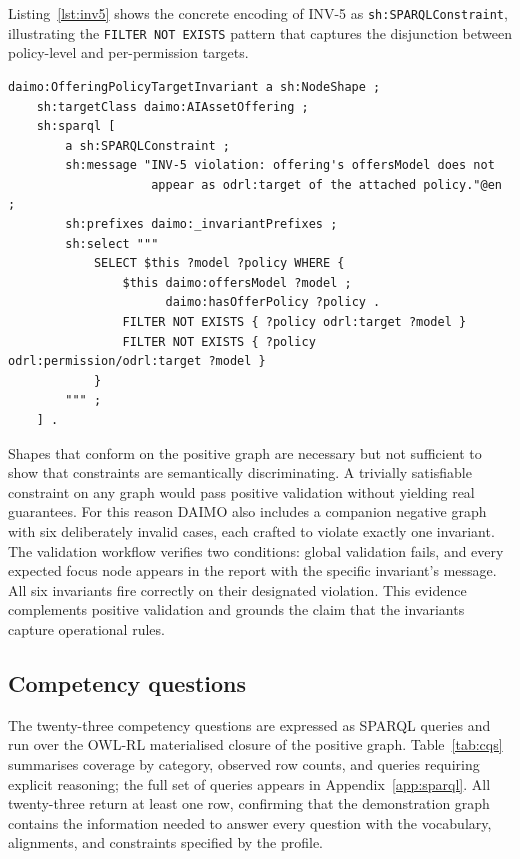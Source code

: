 \documentclass[11pt,a4paper]{article}
\newcommand{\code}[1]{\texttt{#1}}
\begin{document}
Listing~\ref{lst:inv5} shows the concrete encoding of INV-5 as \code{sh:SPARQLConstraint}, illustrating the \code{FILTER NOT EXISTS} pattern that captures the disjunction between policy-level and per-permission targets.

\begin{lstlisting}[label=lst:inv5,caption={INV-5 encoded as a \code{sh:SPARQLConstraint}.}]
daimo:OfferingPolicyTargetInvariant a sh:NodeShape ;
    sh:targetClass daimo:AIAssetOffering ;
    sh:sparql [
        a sh:SPARQLConstraint ;
        sh:message "INV-5 violation: offering's offersModel does not
                    appear as odrl:target of the attached policy."@en ;
        sh:prefixes daimo:_invariantPrefixes ;
        sh:select """
            SELECT $this ?model ?policy WHERE {
                $this daimo:offersModel ?model ;
                      daimo:hasOfferPolicy ?policy .
                FILTER NOT EXISTS { ?policy odrl:target ?model }
                FILTER NOT EXISTS { ?policy odrl:permission/odrl:target ?model }
            }
        """ ;
    ] .
\end{lstlisting}

Shapes that conform on the positive graph are necessary but not sufficient to show that constraints are semantically discriminating. A trivially satisfiable constraint on any graph would pass positive validation without yielding real guarantees. For this reason DAIMO also includes a companion negative graph with six deliberately invalid cases, each crafted to violate exactly one invariant. The validation workflow verifies two conditions: global validation fails, and every expected focus node appears in the report with the specific invariant's message. All six invariants fire correctly on their designated violation. This evidence complements positive validation and grounds the claim that the invariants capture operational rules.

\subsection{Competency questions}\label{sec:eval-cqs}

The twenty-three competency questions are expressed as SPARQL queries and run over the OWL-RL materialised closure of the positive graph. Table~\ref{tab:cqs} summarises coverage by category, observed row counts, and queries requiring explicit reasoning; the full set of queries appears in Appendix~\ref{app:sparql}. All twenty-three return at least one row, confirming that the demonstration graph contains the information needed to answer every question with the vocabulary, alignments, and constraints specified by the profile.
\end{document}
